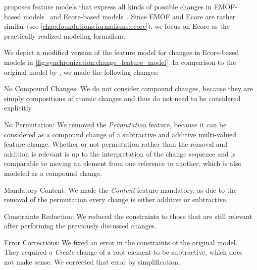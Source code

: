 \citeauthor{kramer2017a} proposes feature models that express all kinds of possible changes in \gls{EMOF}-based models~\cite[Fig. 5.2]{kramer2017a} and Ecore-based models~\cite[Fig.~5.3]{kramer2017a}.
Since \gls{EMOF} and Ecore are rather similar (see \autoref{chap:foundations:formalisms:ecore}), we focus on Ecore as the practically realized modeling formalism.

We depict a modified version of the feature model for changes in Ecore-based models in \autoref{fig:synchronization:change_feature_model}.
In comparison to the original model by \textcite[Fig. 5.3]{kramer2017a}, we made the following changes:
\begin{properdescription}
    \item[No Compound Changes:] We do not consider compound changes, because they are simply compositions of atomic changes and thus do not need to be considered explicitly.
    \item[No Permutation:] We removed the \emph{Permutation} feature, because it can be considered as a compound change of a subtractive and additive multi-valued feature change. Whether or not permutation rather than the removal and addition is relevant is up to the interpretation of the change sequence and is comparable to moving an element from one reference to another, which is also modeled as a compound change.
    \item[Mandatory Content:] We made the \emph{Content} feature mandatory, as due to the removal of the permutation every change is either additive or subtractive.
    \item[Constraints Reduction:] We reduced the constraints to those that are still relevant after performing the previously discussed changes.
    \item[Error Corrections:] We fixed an error in the constraints of the original model. They required a \emph{Create} change of a root element to be subtractive, which does not make sense. We corrected that error by simplification.
\end{properdescription}

